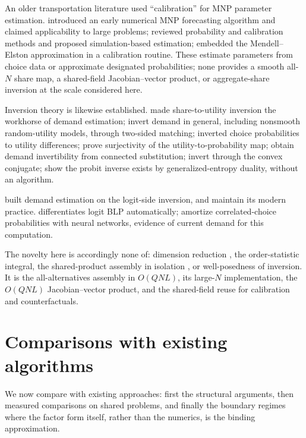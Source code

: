 \documentclass[12pt]{article}
\theoremstyle{remark}
\begin{document}
An older transportation literature used ``calibration'' for MNP
parameter estimation. \citet{daganzo1977} introduced an early numerical
MNP forecasting algorithm and claimed applicability to large problems;
\citet{sheffi1982} reviewed probability and calibration methods and
proposed simulation-based estimation; \citet{kamakura1989} embedded the
Mendell--Elston approximation in a calibration routine. These estimate
parameters from choice data or approximate designated probabilities;
none provides a smooth all-$N$ share map, a shared-field
Jacobian--vector product, or aggregate-share inversion at the scale
considered here.

Inversion theory is likewise established. \citet{berry1994} made
share-to-utility inversion the workhorse of demand estimation;
\citet{bonnet2022} invert demand in general, including nonsmooth
random-utility models, through two-sided matching;
\citet{hotz1993}
inverted choice probabilities to utility differences; \citet{norets2013}
prove surjectivity of the utility-to-probability map;
\citet{bgh2013} obtain demand invertibility from
connected substitution;
\citet{chiong2016} invert through the convex
conjugate; \citet{fosgerau2020} show the probit inverse exists by
generalized-entropy duality, without an algorithm.

 \citet{berry1995} built demand
estimation on the logit-side inversion, and \citet{conlon2020}
maintain its modern practice. \citet{chia2021}
differentiates logit BLP automatically; \citet{huch2026}
amortize correlated-choice probabilities with neural networks, evidence of
current demand for this computation.

The novelty here is accordingly none of: dimension reduction
\citep{curnow1962}, the order-statistic integral, the shared-product
assembly in isolation \citep{mahani2019,cotton2021}, or well-posedness of
inversion. It is the
all-alternatives assembly in $O(QNL)$, its large-$N$ implementation, the
$O(QNL)$ Jacobian--vector product, and the shared-field reuse for
calibration and counterfactuals.

\section{Comparisons with existing algorithms}\label{sec:comparisons}
\label{sec:boundary}

We now compare with existing approaches: first the structural
arguments, then measured comparisons on shared problems, and finally
the boundary regimes where the factor form itself, rather than the
numerics, is the binding approximation.
\end{document}

